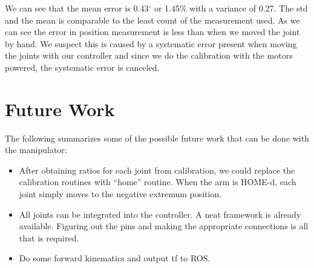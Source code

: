 \documentclass[10pt,a4paper]{article}
\begin{document}
We can see that the mean error is 0.43$ ^{\circ} $ or 1.45\% with a variance of 0.27. The std and the mean is comparable to the least count of the measurement used.
As we can see the error in position measurement is less than when we moved the joint by hand. We suspect this is caused by a systematic error present when moving the joints with our controller and since we do the calibration with the motors powered, the systematic error is canceled.

\section{Future Work}

The following summarizes some of the possible future work that can be
done with the manipulator: 

\begin{itemize}
\item After obtaining ratios for each joint from calibration, we could
  replace the calibration routines with ``home'' routine. When the arm
  is HOME-d, each joint simply moves to the negative extremum
  position. 
\item All joints can be integrated into the controller. A neat
  framework is already available. Figuring out the pins and making the
  appropriate connections is all that is required.
\item Do some forward kinematics and output tf to ROS.
\end{itemize}



\end{document}
